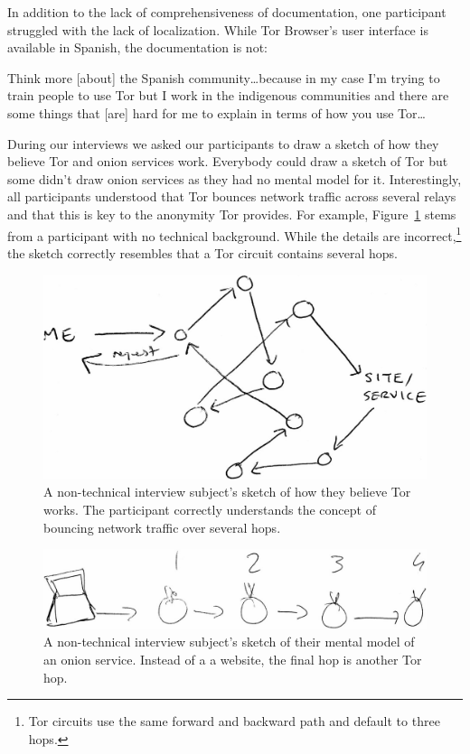 In addition to the lack of comprehensiveness of documentation, one participant struggled
with the lack of localization.  While Tor Browser's user interface is available
in Spanish, the documentation is not:

\begin{displayquote}
Think more [about] the Spanish community\dots because in my case I'm trying to
train people to use Tor but I work in the indigenous communities and there are
some things that [are] hard for me to explain in terms of how you use Tor\dots
\end{displayquote}

During our interviews we asked our participants to draw a sketch of how they
believe Tor and onion services work.  Everybody could draw a sketch of Tor but
some didn't draw onion services as they had no mental model for it.
Interestingly, all participants understood that Tor bounces network traffic
across several relays and that this is key to the anonymity Tor provides.  For
example, Figure~\ref{fig:tor-sketch} stems from a participant with no technical
background.  While the details are incorrect,\footnote{Tor circuits use the same
forward and backward path and default to three hops.} the sketch correctly
resembles that a Tor circuit contains several hops.

\begin{figure}[t]
    \centering
    \includegraphics[width=0.8\linewidth]{figures/p08-tor-sketch.jpg}
    \caption{A non-technical interview subject's sketch of how they believe Tor
    works.  The participant correctly understands the concept of bouncing
    network traffic over several hops.}
    \label{fig:tor-sketch}
\end{figure}

\begin{figure}[t]
    \centering
    \includegraphics[width=0.8\linewidth]{figures/p01-os-sketch.jpg}
    \caption{A non-technical interview subject's sketch of their mental model
    of an onion service.  Instead of a a website, the final hop is another Tor
    hop.}
    \label{fig:os-sketch}
\end{figure}

